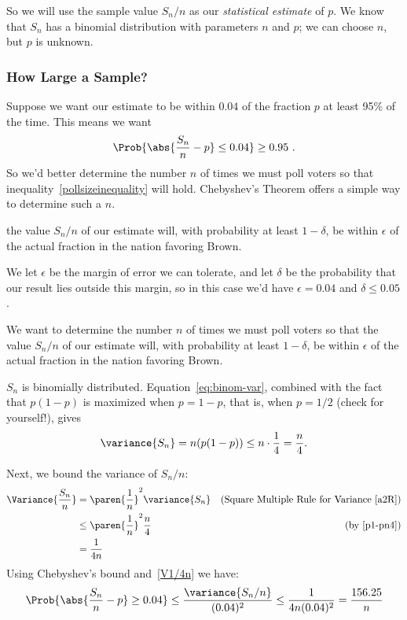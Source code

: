 \iffalse Note that
\[
\expect{\frac{S_n}{n}} = \sum_{i=1}^n \expect{K_i} = pn.
\]
\fi

So we will use the sample value $S_n/n$ as our \emph{statistical
  estimate} of $p$.  We know that $S_n$ has a binomial distribution
with parameters $n$ and $p$; we can choose $n$, but $p$ is unknown.

\subsubsection{How Large a Sample?}
Suppose we want our estimate to be within $0.04$ of the fraction $p$
at least 95\% of the time.  This means we want
\begin{equation}\label{pollsizeinequality}
\Prob{\abs{\frac{S_n}{n} - p} \leq 0.04} \geq 0.95\ .
\end{equation}
So we'd better determine the number $n$ of times we must poll voters so
that inequality~\eqref{pollsizeinequality} will hold.  Chebyshev's
Theorem offers a simple way to determine such a $n$.

\begin{editingnotes}
the value $S_n/n$ of our estimate will, with probability at least
$1 -\delta$, be within $\epsilon$ of the actual fraction in the nation
favoring Brown.

We let $\epsilon$ be the margin of error we can tolerate, and let $\delta$
be the probability that our result lies outside this margin, so in this
case we'd have $\epsilon = 0.04$ and $\delta \le 0.05$.

We want to determine the number $n$ of times we must poll voters so that
the value $S_n/n$ of our estimate will, with probability at least
$1 -\delta$, be within $\epsilon$ of the actual fraction in the nation
favoring Brown.
\end{editingnotes}

$S_n$ is binomially distributed.  Equation~\eqref{eq:binom-var},
combined with the fact that $p(1-p)$ is maximized when $p = 1-p$, that
is, when $p=1/2$ (check for yourself!), gives
\begin{equation}\label{p1-pn4}
\variance{S_n}  = n(p(1-p)) \leq n \cdot \frac{1}{4} = \frac{n}{4}.
\end{equation}

Next, we bound the variance of $S_n/n$:
\begin{align}
\Variance{\frac{S_n}{n}}
       & = \paren{\frac{1}{n}}^2 \variance{S_n}
                     & \text{(Square Multiple Rule for Variance~\eqref{a2R})}\notag\\
       & \leq \paren{\frac{1}{n}}^2 \frac{n}{4} & \text{(by~\eqref{p1-pn4})}\notag\\
       & = \frac{1}{4n}\label{V1/4n}
\end{align}
Using Chebyshev's bound and~\eqref{V1/4n} we have:
\begin{equation}\label{CK}
\Prob{\abs{\frac{S_n}{n} - p} \geq 0.04}
    \leq \frac{\variance{S_n/n}}{(0.04)^2}
       \leq \frac{1}{4n(0.04)^2} = \frac{156.25}{n}
\end{equation}

